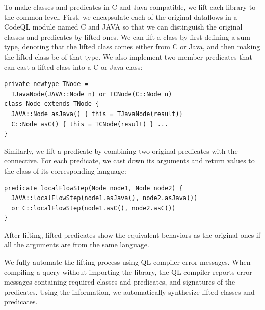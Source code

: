 To make classes and predicates in C and Java compatible,
we lift each library to the common level.
First, we encapsulate each of the original dataflows in a CodeQL
module named C and JAVA so that we can distinguish the original
classes and predicates by lifted ones.
We can lift a class by first defining a sum type, denoting that
the lifted class comes either from C or Java, and then making the
lifted class be of that type.  We also implement two member predicates
that can cast a lifted class into a C or Java class:
\begin{lstlisting}[style=codeql,xleftmargin=2.5em]
private newtype TNode =
  TJavaNode(JAVA::Node n) or TCNode(C::Node n)
class Node extends TNode {
  JAVA::Node asJava() { this = TJavaNode(result)}
  C::Node asC() { this = TCNode(result) } ...
}
\end{lstlisting}
Similarly, we lift a predicate by combining two original predicates with
the  connective. For each predicate, we cast down
its arguments and return values to the class of its corresponding language:
\begin{lstlisting}[style=codeql,xleftmargin=2.5em]
predicate localFlowStep(Node node1, Node node2) {
  JAVA::localFlowStep(node1.asJava(), node2.asJava())
  or C::localFlowStep(node1.asC(), node2.asC())
}
\end{lstlisting}
After lifting, lifted predicates show the equivalent behaviors as the
original ones if all the arguments are from the same language.

We fully automate the lifting process using QL compiler error
messages. When compiling a query without importing the library, the QL compiler
reports error messages containing required classes and predicates, and
signatures of the predicates. Using the information, we
automatically synthesize lifted classes and predicates.


